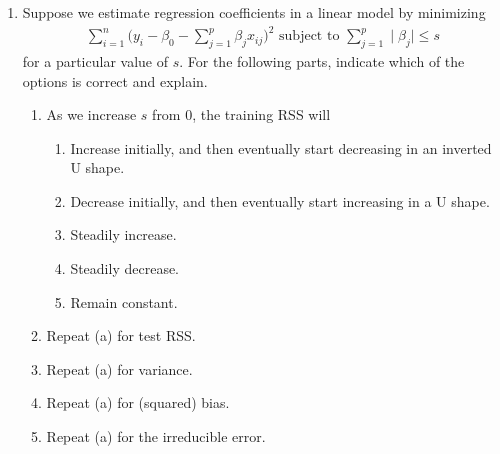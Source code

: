 \documentclass[11pt, a4paper]{article}
\begin{document}
\begin{enumerate}
        \item Suppose we estimate regression coefficients in a linear model by minimizing
        \begin{gather*}
            \sum_{i=1}^{n}\bigg( y_{i} - \beta_{0} - \sum_{j=1}^{p}\beta_{j}x_{ij} \bigg)^{2} \text{ subject to } \sum_{j=1}^{p}\mid \beta_{j} \mid \leq s
        \end{gather*}
        for a particular value of $s$. For the following parts, indicate which of the options is correct and explain.
        \begin{enumerate}
            \item As we increase $s$ from 0, the training RSS will
            \begin{enumerate}
                \item Increase initially, and then eventually start decreasing in an inverted U shape.
                \item Decrease initially, and then eventually start increasing in a U shape.
                \item Steadily increase.
                \item Steadily decrease.
                \item Remain constant.
            \end{enumerate}
            \item Repeat (a) for test RSS.
            \item Repeat (a) for variance.
            \item Repeat (a) for (squared) bias.
            \item Repeat (a) for the irreducible error.
        \end{enumerate}
        

\end{enumerate}
\end{document}
